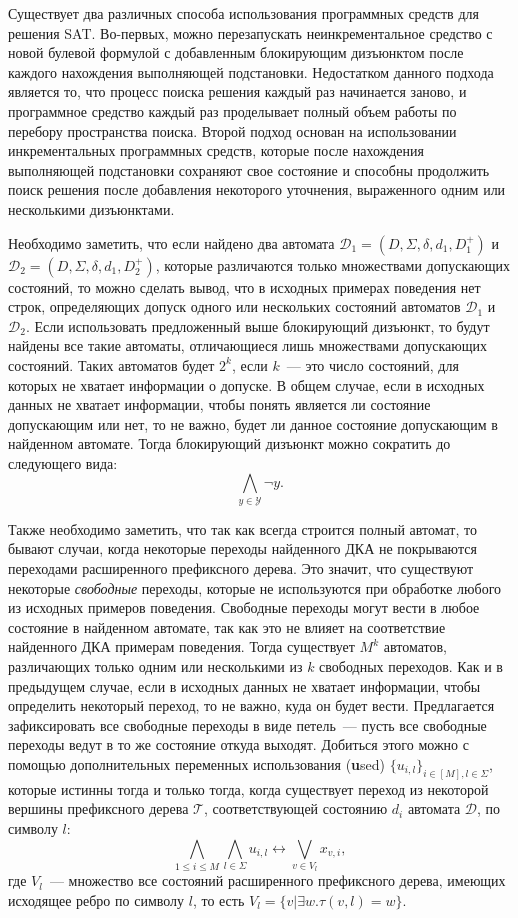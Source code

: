 Существует два различных способа использования программных средств для решения SAT.
Во-первых, можно перезапускать неинкрементальное средство с новой булевой формулой с добавленным блокирующим дизъюнктом после каждого нахождения выполняющей подстановки.
Недостатком данного подхода является то, что процесс поиска решения каждый раз начинается заново, и программное средство каждый раз проделывает полный объем работы по перебору пространства поиска.
Второй подход основан на использовании инкрементальных программных средств, которые после нахождения выполняющей подстановки сохраняют свое состояние и способны продолжить поиск решения после добавления некоторого уточнения, выраженного одним или несколькими дизъюнктами.


Необходимо заметить, что если найдено два автомата $\mathcal{D}_1 = \left(D,\Sigma,\delta,d_{1},D_{1}^{+}\right)$ и $\mathcal{D}_2 = \left(D,\Sigma,\delta,d_{1},D_{2}^{+}\right)$, которые различаются только множествами допускающих состояний, то можно сделать вывод, что в исходных примерах поведения нет строк, определяющих допуск одного или нескольких состояний автоматов $\mathcal{D}_{1}$ и $\mathcal{D}_{2}$.
Если использовать предложенный выше блокирующий дизъюнкт, то будут найдены все такие автоматы, отличающиеся лишь множествами допускающих состояний.
Таких автоматов будет $2^{k}$, если $k$~{---} это число состояний, для которых не хватает информации о допуске.
В общем случае, если в исходных данных не хватает информации, чтобы понять является ли состояние допускающим или нет, то не важно, будет ли данное состояние допускающим в найденном автомате.
Тогда блокирующий дизъюнкт можно сократить до следующего вида: $$\bigwedge_{y \in \mathcal{Y}} \neg y.$$

Также необходимо заметить, что так как всегда строится полный автомат, то бывают случаи, когда некоторые переходы найденного ДКА не покрываются переходами расширенного префиксного дерева.
Это значит, что существуют некоторые \emph{свободные} переходы, которые не используются при обработке любого из исходных примеров поведения.
Свободные переходы могут вести в любое состояние в найденном автомате, так как это не влияет на соответствие найденного ДКА примерам поведения.
Тогда существует $M^{k}$ автоматов, различающих только одним или несколькими из $k$ свободных переходов.
Как и в предыдущем случае, если в исходных данных не хватает информации, чтобы определить некоторый переход, то не важно, куда он будет вести.
Предлагается зафиксировать все свободные переходы в виде петель~{---} пусть все свободные переходы ведут в то же состояние откуда выходят.
Добиться этого можно с помощью дополнительных переменных использования (\textbf{u}sed) $\{u_{i,l}\}_{i \in \left[M\right],l \in \Sigma}$, которые истинны тогда и только тогда, когда существует переход из некоторой вершины префиксного дерева $\mathcal{T}$, соответствующей состоянию $d_{i}$ автомата $\mathcal{D}$, по символу $l$: $$\bigwedge_{1 \leq i \leq M} \bigwedge_{l \in \Sigma} u_{i,l} \leftrightarrow \bigvee_{v \in V_{l}}x_{v,i},$$
где $V_{l}$~{---} множество все состояний расширенного префиксного дерева, имеющих исходящее ребро по символу $l$, то есть $V_{l} = \{v | \exists w.\tau\left(v,l\right) = w\}$.

